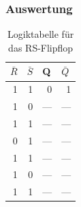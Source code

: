 \documentclass[12pt,a4paper]{article}
\begin{document}
\subsubsection*{Auswertung}

\begin{table}[H]
\begin{center}
\begin{tabular}{r|r|l|l}

\multicolumn{1}{l|}{$\bar{R}$} & \multicolumn{1}{l|}{$\bar{S}$} & Q & $\bar{Q}$ \\ \hline \hline
1 & 1 & \multicolumn{1}{r|}{0} & \multicolumn{1}{r}{1} \\ 
1 & 0 & --- & --- \\ 
1 & 1 & --- & --- \\ 
0 & 1 & --- & --- \\ 
1 & 1 & --- & --- \\ 
1 & 0 & --- & --- \\ 
1 & 1 & --- & --- \\ 
\end{tabular}
\end{center}
\caption{Logiktabelle für das RS-Flipflop}
\label{tab:2_5}
\end{table}
\end{document}
